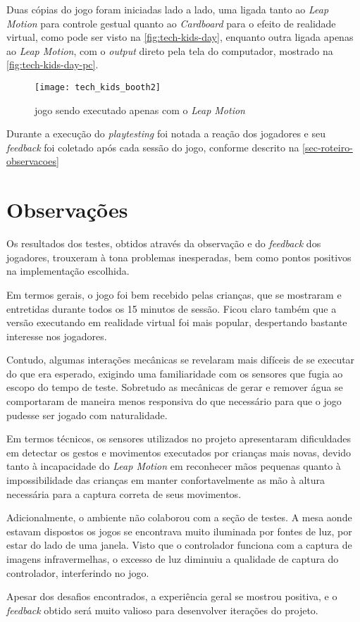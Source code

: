 Duas cópias do jogo foram iniciadas lado a lado, uma ligada tanto ao \textit{Leap Motion} para controle gestual quanto ao \textit{Cardboard} para o efeito de realidade virtual, como pode ser visto na \autoref{fig:tech-kids-day}, enquanto outra ligada apenas ao \textit{Leap Motion}, com o \textit{output} direto pela tela do computador, mostrado na \autoref{fig:tech-kids-day-pc}.

\begin{figure}[h]
	\centering
	\caption{jogo sendo executado apenas com o \textit{Leap Motion}}
	\texttt{[image: tech\_kids\_booth2]}
	\legend{\fonteAP}
	\label{fig:tech-kids-day-pc}
\end{figure}

Durante a execução do \textit{playtesting} foi notada a reação dos jogadores e seu \textit{feedback} foi coletado após cada sessão do jogo, conforme descrito na \autoref{sec-roteiro-observacoes}

\section{Observações}\label{sec-roteiro-observacoes}

Os resultados dos testes, obtidos através da observação e do \textit{feedback} dos jogadores, trouxeram à tona problemas inesperadas, bem como pontos positivos na implementação escolhida.

Em termos gerais, o jogo foi bem recebido pelas crianças, que se mostraram e entretidas durante todos os 15 minutos de sessão. Ficou claro também que a versão executando em realidade virtual foi mais popular, despertando bastante interesse nos jogadores.

Contudo, algumas interações mecânicas se revelaram mais difíceis de se executar do que era esperado, exigindo uma familiaridade com os sensores que fugia ao escopo do tempo de teste. Sobretudo as mecânicas de gerar e remover água se comportaram de maneira menos responsiva do que necessário para que o jogo pudesse ser jogado com naturalidade.

Em termos técnicos, os sensores utilizados no projeto apresentaram dificuldades em detectar os gestos e movimentos executados por crianças mais novas, devido tanto à incapacidade do \textit{Leap Motion} em reconhecer mãos pequenas quanto à impossibilidade das crianças em manter confortavelmente as mão à altura necessária para a captura correta de seus movimentos. 

Adicionalmente, o ambiente não colaborou com a seção de testes. A mesa aonde estavam dispostos os jogos se encontrava muito iluminada por fontes de luz, por estar do lado de uma janela. Visto que o controlador funciona com a captura de imagens infravermelhas, o excesso de luz diminuiu a qualidade de captura do controlador, interferindo no jogo.

Apesar dos desafios encontrados, a experiência geral se mostrou positiva, e o \textit{feedback} obtido será muito valioso para desenvolver iterações do projeto.